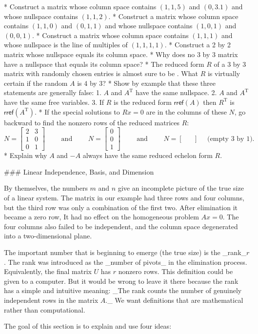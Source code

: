 * Construct a matrix whose column space contains \((1,1,5)\) and \((0,3.1)\) and whose nullspace contains \((1,1,2)\).
* Construct a matrix whose column space contains \((1,1,0)\) and \((0,1,1)\) and whose nullspace contains \((1,0,1)\) and \((0,0,1)\).
* Construct a matrix whose column space contains \((1,1,1)\) and whose nullspace is the line of multiples of \((1,1,1,1)\).
* Construct a 2 by 2 matrix whose nullspace equals its column space.
* Why does no 3 by 3 matrix have a nullspace that equals its column space?
* The reduced form \(R\) of a 3 by 3 matrix with randomly chosen entries is almost sure to be . What \(R\) is virtually certain if the random \(A\) is 4 by 3?
* Show by example that these three statements are generally false: 1. \(A\) and \(A^{\mathrm{T}}\) have the same nullspace. 2. \(A\) and \(A^{\mathrm{T}}\) have the same free variables. 3. If \(R\) is the reduced form \(\mathsf{rref}(A)\) then \(R^{\mathrm{T}}\) is \(\mathsf{rref}(A^{\mathrm{T}})\).
* If the special solutions to \(Rx=0\) are in the columns of these \(N\), go backward to find the nonzero rows of the reduced matrices \(R\): \[N=\begin{bmatrix}2&3\\ 1&0\\ 0&1\end{bmatrix}\qquad\text{ and }\qquad N=\begin{bmatrix}0\\ 0\\ 1\end{bmatrix}\qquad\text{ and }\qquad N=\begin{bmatrix}&\\ &\end{bmatrix}\quad\text{ (empty 3 by 1).}\]
* Explain why \(A\) and \(-A\) always have the same reduced echelon form \(R\).

### Linear Independence, Basis, and Dimension

By themselves, the numbers \(m\) and \(n\) give an incomplete picture of the true size of a linear system. The matrix in our example had three rows and four columns, but the third row was only a combination of the first two. After elimination it became a zero row, It had no effect on the homogeneous problem \(Ax=0\). The four columns also failed to be independent, and the column space degenerated into a two-dimensional plane.

The important number that is beginning to emerge (the true size) is the _rank_\(r\). The rank was introduced as the _number of pivots_ in the elimination process. Equivalently, the final matrix \(U\) has \(r\) nonzero rows. This definition could be given to a computer. But it would be wrong to leave it there because the rank has a simple and intuitive meaning: _The rank counts the number of genuinely independent rows in the matrix \(A\)._ We want definitions that are mathematical rather than computational.

The goal of this section is to explain and use four ideas: 